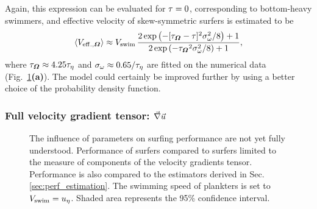 Again, this expression can be evaluated for $\tau = 0$, corresponding to bottom-heavy swimmers, and effective velocity of skew-symmetric surfers is estimated to be
\begin{equation}\label{turb:eq:performance_surf_asym_final}
	\left\langle V_{\mathrm{eff.}, \boldsymbol{\varOmega}} \right\rangle \approx V_{\mathrm{swim}} \, \frac{ 2 \exp \left( -[ \tau_{\boldsymbol{\varOmega}} - \tau ]^2 \sigma_{\omega}^2 / 8 \right) + 1}{2 \exp \left( -{\tau_{\boldsymbol{\varOmega}}}^2 \sigma_{\omega}^2 / 8 \right) + 1},
\end{equation}
where $\tau_{\boldsymbol{\varOmega}} \approx 4.25 \tau_{\eta}$ and $\sigma_{\omega} \approx 0.65 / \tau_{\eta}$ are fitted on the numerical data (Fig.~\ref{fig:surfing_partial_and_models}\textbf{(a)}).
The model could certainly be improved further by using a better choice of the probability density function.

\subsubsection{Full velocity gradient tensor: $\vec{\nabla} \vec{u}$}

\begin{figure}%
	\centering
	
	\caption[The influence of parameters on surfing performance are not yet fully understood.]{
		The influence of parameters on surfing performance are not yet fully understood.
		Performance of surfers compared to surfers limited to the measure of components of the velocity gradients tensor.
		Performance is also compared to the estimators derived in Sec.\ref{sec:perf_estimation}.
		The swimming speed of plankters is set to $V_{\mathrm{swim}} = u_{\eta}$.
		Shaded area represents the 95\% confidence interval.
	}
	\label{fig:surfing_partial_and_models}
\end{figure}

